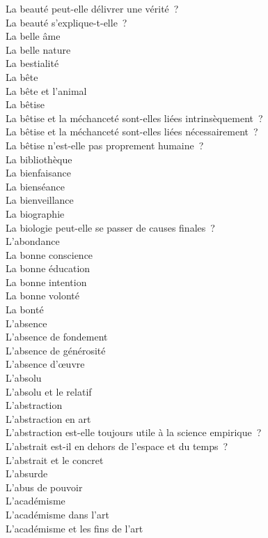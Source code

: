 \documentclass[a4paper,12pt]{article}
\begin{document}
La beauté peut-elle délivrer une vérité ? \\
La beauté s'explique-t-elle ? \\
La belle âme \\
La belle nature \\
La bestialité \\
La bête \\
La bête et l'animal \\
La bêtise \\
La bêtise et la méchanceté sont-elles liées intrinsèquement ? \\
La bêtise et la méchanceté sont-elles liées nécessairement ? \\
La bêtise n'est-elle pas proprement humaine ? \\
La bibliothèque \\
La bienfaisance \\
La bienséance \\
La bienveillance \\
La biographie \\
La biologie peut-elle se passer de causes finales ? \\
L'abondance \\
La bonne conscience \\
La bonne éducation \\
La bonne intention \\
La bonne volonté \\
La bonté \\
L'absence \\
L'absence de fondement \\
L'absence de générosité \\
L'absence d'œuvre \\
L'absolu \\
L'absolu et le relatif \\
L'abstraction \\
L'abstraction en art \\
L'abstraction est-elle toujours utile à la science empirique ? \\
L'abstrait est-il en dehors de l'espace et du temps ? \\
L'abstrait et le concret \\
L'absurde \\
L'abus de pouvoir \\
L'académisme \\
L'académisme dans l'art \\
L'académisme et les fins de l'art \\
\end{document}
